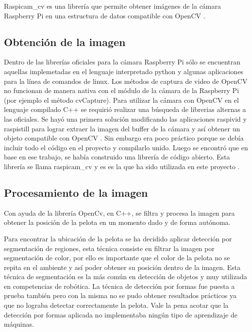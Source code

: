 Raspicam\_cv es una librería que permite obtener im\'agenes de la cámara Raspberry Pi en una estructura de datos compatible con OpenCV \cite{emilV}.

\subsection{Obtenci\'on de la imagen}\label{extraerImagen}

Dentro de las librerías oficiales para la cámara Raspberry Pi s\'olo se encuentran aquellas implemetadas en el lenguaje interpretado python y algunas aplicaciones para la línea de comandos de linux. Los métodos de captura de video de OpenCV no funcionan de manera nativa con el m\'odulo de la cámara de la Raspberry Pi (por ejemplo el método cvCapture). Para utilizar la cámara con OpenCV en el lenguaje compilado C++ se requirió realizar una búsqueda de librerias alternas a las oficiales. Se hayó una primera solución modificando las aplicaciones raspivid y raspistill para lograr extraer la imagen del buffer de la cámara y así obtener un objeto compatible con OpenCV \cite{pierreR}. Sin embargo era poco práctico porque se debía incluir todo el código en el proyecto y compilarlo unido. Luego se encontró que en base en ese trabajo, se había construido una librería de código abierto. Esta librería se llama raspicam\_cv y es es la que ha sido utilizada en este proyecto \cite{emilV}.


\subsection{Procesamiento de la imagen}\label{procesarImagen}

Con ayuda de la librería OpenCv, en C++, se filtra y procesa la imagen para obtener la posición de la pelota en un momento dado y de forma autónoma. 

Para encontrar la ubicación de la pelota  se ha decidido aplicar detección por segmentación de regiones, esta técnica consiste en filtrar la imagen por segmentaci\'on de color, por ello es importante que el color de la pelota no se repita en el ambiente y así poder obtener su posición dentro de la imagen. Esta t\'ecnica de segmentaci\'on es la m\'as com\'un en detecci\'on de objetos y muy utilizada en competencias de rob\'otica. La t\'ecnica de detecci\'on por  formas fue puesta a prueba tambi\'en pero con la misma no se pudo obtener resultados pr\'acticos ya que no lograba detectar correctamente la pelota. Vale la pena acotar que la detecci\'on por formas aplicada no implementaba ning\'un tipo de aprendizaje de m\'aquinas.


